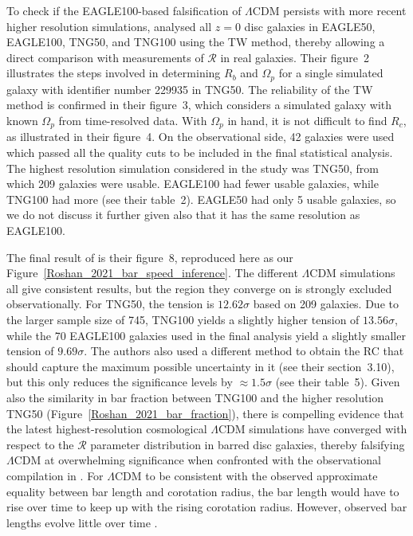 \documentclass[fleqn,usenatbib,useAMS,onecolumn]{mnras} %
\begin{document}
To check if the EAGLE100-based falsification of $\Lambda$CDM persists with more recent higher resolution simulations, \citet{Roshan_2021_bar_speed} analysed all $z = 0$ disc galaxies in EAGLE50, EAGLE100, TNG50, and TNG100 using the TW method, thereby allowing a direct comparison with measurements of $\mathcal{R}$ in real galaxies. Their figure~2 illustrates the steps involved in determining $R_b$ and $\Omega_p$ for a single simulated galaxy with identifier number 229935 in TNG50. The reliability of the TW method is confirmed in their figure~3, which considers a simulated galaxy with known $\Omega_p$ from time-resolved data. With $\Omega_p$ in hand, it is not difficult to find $R_c$, as illustrated in their figure~4. On the observational side, 42 galaxies were used which passed all the quality cuts to be included in the final statistical analysis. The highest resolution simulation considered in the study was TNG50, from which 209 galaxies were usable. EAGLE100 had fewer usable galaxies, while TNG100 had more (see their table~2). EAGLE50 had only 5 usable galaxies, so we do not discuss it further given also that it has the same resolution as EAGLE100.

The final result of \citet{Roshan_2021_bar_speed} is their figure~8, reproduced here as our Figure~\ref{Roshan_2021_bar_speed_inference}. The different $\Lambda$CDM simulations all give consistent results, but the region they converge on is strongly excluded observationally. For TNG50, the tension is $12.62\sigma$ based on 209 galaxies. Due to the larger sample size of 745, TNG100 yields a slightly higher tension of $13.56\sigma$, while the 70 EAGLE100 galaxies used in the final analysis yield a slightly smaller tension of $9.69\sigma$. The authors also used a different method to obtain the RC that should capture the maximum possible uncertainty in it (see their section~3.10), but this only reduces the significance levels by $\approx 1.5\sigma$ (see their table~5). Given also the similarity in bar fraction between TNG100 and the higher resolution TNG50 (Figure~\ref{Roshan_2021_bar_fraction}), there is compelling evidence that the latest highest-resolution cosmological $\Lambda$CDM simulations have converged with respect to the $\mathcal{R}$ parameter distribution in barred disc galaxies, thereby falsifying $\Lambda$CDM at overwhelming significance when confronted with the observational compilation in \citet{Cuomo_2020}. For $\Lambda$CDM to be consistent with the observed approximate equality between bar length and corotation radius, the bar length would have to rise over time to keep up with the rising corotation radius. However, observed bar lengths evolve little over time \citep{Kim_2021_bar_speed, Lee_2022}.
\end{document}
